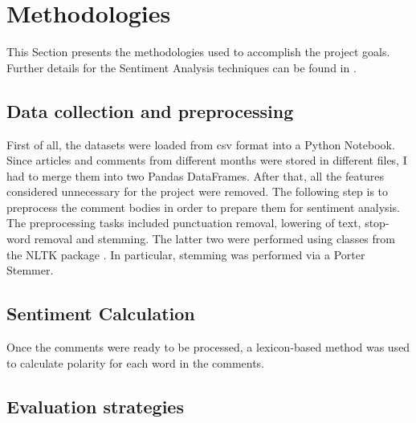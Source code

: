 \section{Methodologies}
\label{Metho}

This Section presents the methodologies used to accomplish the project goals. Further details for the Sentiment Analysis techniques can be found in \cite{Aggarwal}.

\subsection{Data collection and preprocessing}

First of all, the datasets were loaded from csv format into a Python Notebook. Since articles and comments from different months were stored in different files, I had to merge them into two Pandas DataFrames. After that, all the features considered unnecessary for the project were removed. 
The following step is to preprocess the comment bodies in order to prepare them for sentiment analysis. The preprocessing tasks included punctuation removal, lowering of text, stop-word removal and stemming. The latter two were performed using classes from the NLTK package \cite{NLTK}. In particular, stemming was performed via a Porter Stemmer.

\subsection{Sentiment Calculation}
Once the comments were ready to be processed, a lexicon-based method was used to calculate polarity for each word in the comments. 

\subsection{Evaluation strategies}

